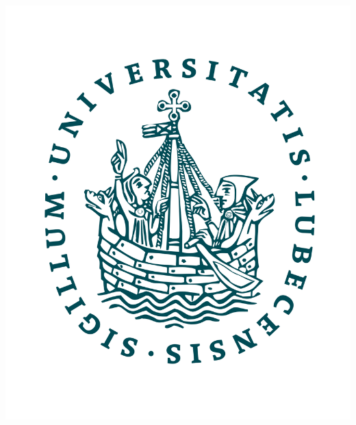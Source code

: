 \documentclass[12pt,a4paper]{article}
\begin{document}
{\begin{center}
\bigskip
% 
{%
\begin{minipage}[c]{.19\textwidth} 
{\bigskip\medskip
\begin{center}%
{%
\includegraphics[width=\textwidth, clip
]{Siegel-Uni-Luebeck.svg.png}}\\%
\end{center}}
 \end{minipage}%
 }%
 \hfill
{%
\begin{minipage}[c]{.6\textwidth}
\begin{center}


\end{center}
\end{minipage}}
\end{center}}
\end{document}
